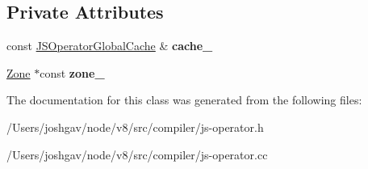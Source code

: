 \subsection*{Private Attributes}
\begin{DoxyCompactItemize}
\item 
const \hyperlink{structv8_1_1internal_1_1compiler_1_1_j_s_operator_global_cache}{J\+S\+Operator\+Global\+Cache} \& {\bfseries cache\+\_\+}\hypertarget{classv8_1_1internal_1_1compiler_1_1_j_s_operator_builder_a4a9e4132d79d98d981deefda41920fcf}{}\label{classv8_1_1internal_1_1compiler_1_1_j_s_operator_builder_a4a9e4132d79d98d981deefda41920fcf}

\item 
\hyperlink{classv8_1_1internal_1_1_zone}{Zone} $\ast$const {\bfseries zone\+\_\+}\hypertarget{classv8_1_1internal_1_1compiler_1_1_j_s_operator_builder_afd9482cdc921c396e8eb54cf3af3fcc9}{}\label{classv8_1_1internal_1_1compiler_1_1_j_s_operator_builder_afd9482cdc921c396e8eb54cf3af3fcc9}

\end{DoxyCompactItemize}


The documentation for this class was generated from the following files\+:\begin{DoxyCompactItemize}
\item 
/\+Users/joshgav/node/v8/src/compiler/js-\/operator.\+h\item 
/\+Users/joshgav/node/v8/src/compiler/js-\/operator.\+cc\end{DoxyCompactItemize}
